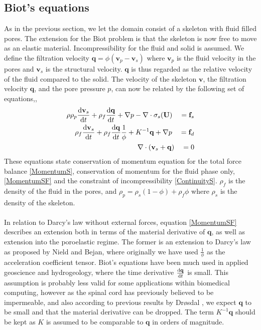 \subsection{Biot's equations} \label{sec:Biot}
As in the previous section, we let the domain consist of a skeleton with fluid filled pores. The extension for the Biot problem is that the skeleton is now free to move as an elastic material. Incompressibility for the fluid and solid is assumed. We define the filtration velocity $\mathbf{q} = \phi(\mathbf{v}_p - \mathbf{v}_s)$ where $\mathbf{v}_p$ is the fluid velocity in the pores and $\mathbf{v}_s$ is the structural velocity. $\mathbf{q}$ is thus regarded as the relative velocity of the fluid compared to the solid. The velocity of the skeleton $\mathbf{v}$, the filtration velocity $\mathbf{q}$, and the pore pressure $p$, can now be related by the following set of equations\cite{Biot41},\cite{Biot55},\cite{Biot72} 
\begin{alignat}
\rho \rho_p \mdi{\mathbf{v}_s}{t} + \rho_f \mdi{\mathbf{q}}{t} + \nabla p - \nabla \cdot \sigma_s(\mathbf{U}) \quad = \mathbf{f}_s \label{MomentumS}  \\
\rho_f \mdi{\mathbf{v}_s}{t} + \rho_f \mdi{\mathbf{q}}{t}\frac{1}{\phi} + K^{-1}\mathbf{q} + \nabla p \quad = \mathbf{f}_d \label{MomentumSF}\\
\nabla \cdot (\mathbf{v}_s + \mathbf{q}) \quad = 0 \label{ContinuityS}
\end{alignat}
These equations state conservation of momentum equation for the total force balance \eqref{MomentumS}, conservation of momentum for the fluid phase only, \eqref{MomentumSF} and the constraint of incompressibility \eqref{ContinuityS}. $\rho_f$ is the density of the fluid in the pores, and $\rho_p = \rho_s(1-\phi) + \rho_f \phi$ where $\rho_s$ is the density of the skeleton. 
\\
\\
In relation to Darcy's law without external forces, equation \eqref{MomentumSF} describes an extension both in terms of the material derivative of $\mathbf{q}$, as well as extension into the poroelastic regime. The former is an extension to Darcy's law as proposed by Nield and Bejan, where originally we have used $\frac{1}{\phi}$ as the acceleration coefficient tensor. Biot's equations have been much used in applied geoscience and hydrogeology, where the time derivative $\frac{\mathrm{d} \mathbf{q}}{\mathrm{d} t}$ is small. This assumption is probably less valid for some applications within biomedical computing, however as the spinal cord has previously believed to be impermeable, and also according to previous results by Dr{\o}sdal \cite{Dros11}, we expect $\mathbf{q}$ to be small and that the material derivative can be dropped. The term $K^{-1}\mathbf{q}$ should be kept as $K$ is assumed to be comparable to $\mathbf{q}$ in orders of magnitude.


